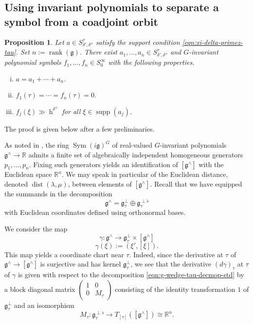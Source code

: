 \documentclass[reqno]{amsart}
\DeclareMathOperator{\h}{h}
\DeclareMathOperator{\dist}{dist}
\DeclareMathOperator{\Sym}{Sym}
\DeclareMathOperator{\rank}{rank}
\DeclareMathOperator{\reg}{reg}
\DeclareMathOperator{\supp}{supp}
\theoremstyle{plain} \newtheorem{theorem} {Theorem}
\newtheorem{proposition} [theorem] {Proposition}
\theoremstyle{definition} \newtheorem{definition} [theorem] {Definition}
\theoremstyle{itplain} %
\numberwithin{equation}{section}
\numberwithin{theorem}{section}
\begin{document}
\subsection{Using invariant polynomials to separate a symbol from a coadjoint orbit}
\label{sec:}
\begin{proposition}\label{lem:produce-inv-polynomials-large-on-symbol-support}
  Let $a \in S^\tau_{\delta ', \delta ''}$ satisfy the support condition \eqref{eqn:xi-delta-primez-tau}.  Set $n := \rank(\mathfrak{g})$.  There exist $a_1,\dotsc,a_n \in S^\tau_{\delta ', \delta''}$ and $G$-invariant polynomial symbols $f_1,\dotsc,f_n \in S^\infty_0$ with the following properties.
  \begin{enumerate}[(i)]
  \item $a = a_1 + \dotsb + a_n$.
  \item $f_1(\tau) = \dotsb = f_n(\tau) = 0$.
  \item $f_j(\xi) \gg \h^{\delta ''}$ for all $\xi \in \supp(a_j)$.
  \end{enumerate}
\end{proposition}
The proof is given below after a few preliminaries.

As noted in \cite[\S9.2]{nelson-venkatesh-1}, the ring $\Sym(i \mathfrak{g})^G$ of real-valued $G$-invariant polynomials $\mathfrak{g}^\wedge \rightarrow \mathbb{R}$ admits a finite set of algebraically independent homogeneous generators $p_1,\dotsc,p_n$.  Fixing such generators yields an identification of $[\mathfrak{g}^\wedge]$ with the Euclidean space $\mathbb{R}^n$.  We may speak in particular of the Euclidean distance, denoted $\dist(\lambda,\mu)$, between elements of $[\mathfrak{g}^\wedge]$.  Recall that we have equipped the summands in the decomposition
\begin{equation}\label{eqn:g-wedge-tau-decmop-std}
  \mathfrak{g}^\wedge = \mathfrak{g}_\tau^\perp \oplus \mathfrak{g}_{\tau}^{\perp \flat}
\end{equation}
with Euclidean coordinates defined using orthonormal bases.

We consider the map
\[
  \gamma : \mathfrak{g}^\wedge \rightarrow \mathfrak{g}_\tau^\perp \times [\mathfrak{g}^\wedge]\]
\[
  \gamma(\xi) := (\xi ', [\xi]).
\]
This map yields a coordinate chart near $\tau$.  Indeed, since the derivative at $\tau$ of $\mathfrak{g}^\wedge \rightarrow [\mathfrak{g}^\wedge]$ is surjective and has kernel $\mathfrak{g}_\tau^\perp$, we see that the derivative $(d \gamma)_\tau$ at $\tau$ of $\gamma$ is given with respect to the decomposition \eqref{eqn:g-wedge-tau-decmop-std} by a block diagonal matrix $\left(
  \begin{smallmatrix}
    1&0\\
    0 &M_\tau
  \end{smallmatrix}
\right)$ consisting of the identity transformation $1$ of $\mathfrak{g}_\tau^\perp$ and an isomorphism
\[M_\tau : \mathfrak{g}_\tau^{\perp \flat} \rightarrow T_{[\tau]}([\mathfrak{g}^\wedge]) \cong \mathbb{R}^n.\]
\end{document}
